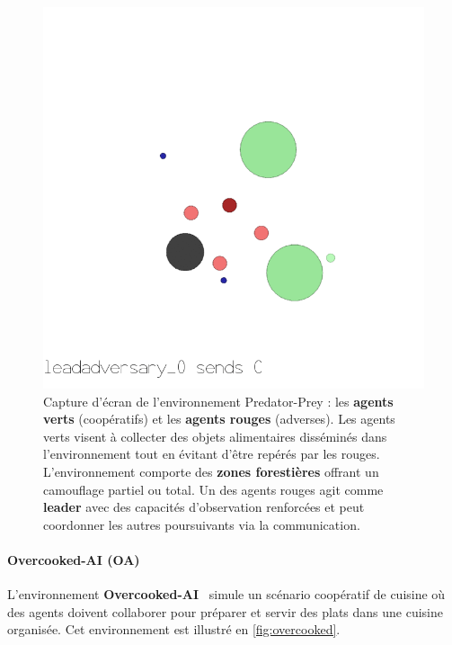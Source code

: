 \documentclass[pdflatex,sn-mathphys-num]{sn-jnl}%
\theoremstyle{thmstyleone}%
\theoremstyle{thmstyletwo}%
\theoremstyle{thmstylethree}%
\begin{document}
\begin{figure}[h!]
    \centering
    \includegraphics[width=0.6\linewidth]{figures/predator_prey.png}
    \caption{Capture d'écran de l'environnement Predator-Prey : les \textbf{agents verts} (coopératifs) et les \textbf{agents rouges} (adverses). Les agents verts visent à collecter des objets alimentaires disséminés dans l'environnement tout en évitant d'être repérés par les rouges. L'environnement comporte des \textbf{zones forestières} offrant un camouflage partiel ou total. Un des agents rouges agit comme \textbf{leader} avec des capacités d'observation renforcées et peut coordonner les autres poursuivants via la communication.}
    \label{fig:predator_prey}
\end{figure}

\paragraph{Overcooked-AI (OA)}

L'environnement \textbf{Overcooked-AI}~\cite{overcookedai} simule un scénario coopératif de cuisine où des agents doivent collaborer pour préparer et servir des plats dans une cuisine organisée. Cet environnement est illustré en \autoref{fig:overcooked}.
\end{document}
